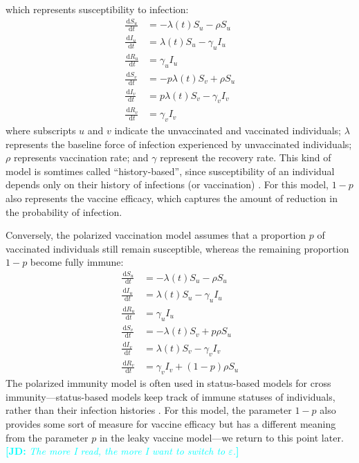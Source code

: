 \documentclass[12pt]{article}
\newcommand{\comment}{\showcomment}
\newcommand{\showcomment}[3]{\textcolor{#1}{\textbf{[#2: }\textsl{#3}\textbf{]}}}
\newcommand{\jd}[1]{\comment{cyan}{JD}{#1}}
\newcommand{\dd}[1]{\ensuremath{\, \mathrm{d}#1}}
\begin{document}
which represents susceptibility to infection:
\begin{align}
\frac{\dd S_u}{\dd t} &= - \lambda(t) S_u - \rho S_u \\
\frac{\dd I_u}{\dd t} &= \lambda(t) S_u - \gamma_u I_u \\
\frac{\dd R_u}{\dd t} &= \gamma_u I_u \\
\frac{\dd S_v}{\dd t} &= - p \lambda(t) S_v + \rho S_u \\
\frac{\dd I_v}{\dd t} &= p \lambda(t) S_v - \gamma_v I_v \\
\frac{\dd R_v}{\dd t} &= \gamma_v I_v
\end{align}
where subscripts $u$ and $v$ indicate the unvaccinated and vaccinated individuals;
$\lambda$ represents the baseline force of infection experienced by unvaccinated individuals; 
$\rho$ represents vaccination rate;
and $\gamma$ represent the recovery rate.
This kind of model is somtimes called “history-based”, since susceptibility of an individual depends only on their history of infections (or vaccination) \citep{gog2002dynamics,gog2002status,kucharski2016capturing}.
For this model, $1-p$ also represents the vaccine efficacy, which captures the amount of reduction in the probability of infection.

Conversely, the polarized vaccination model assumes that a proportion $p$ of vaccinated individuals still remain susceptible, whereas the remaining proportion $1-p$ become fully immune: 
\begin{align}
\frac{\dd S_u}{\dd t} &= - \lambda(t) S_u - \rho S_u \\
\frac{\dd I_u}{\dd t} &= \lambda(t) S_u - \gamma_u I_u \\
\frac{\dd R_u}{\dd t} &= \gamma_u I_u \\
\frac{\dd S_v}{\dd t} &= - \lambda(t) S_v + p \rho S_u \\
\frac{\dd I_v}{\dd t} &= \lambda(t) S_v - \gamma_v I_v \\
\frac{\dd R_v}{\dd t} &= \gamma_v I_v + (1-p) \rho S_u
\end{align}
The polarized immunity model is often used in status-based models for cross immunity---status-based models keep track of immune statuses of individuals, rather than their infection histories \citep{gog2002dynamics,gog2002status,kucharski2016capturing}.
For this model, the parameter $1-p$ also provides some sort of measure for vaccine efficacy but has a different meaning from the parameter $p$ in the leaky vaccine model---we return to this point later.
\jd{The more I read, the more I want to switch to $\varepsilon$.}
\end{document}
